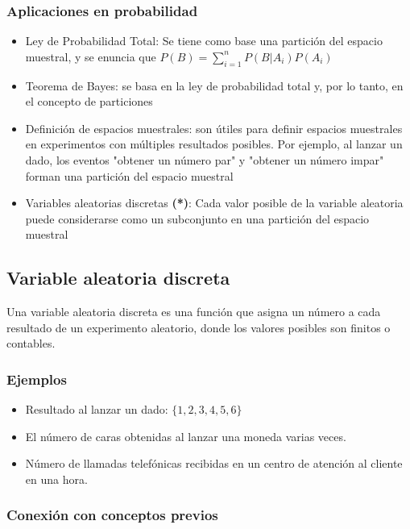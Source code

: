 \documentclass[letterpaper, 12pt]{article}
\begin{document}
	\subsubsection{Aplicaciones en probabilidad}
	
	\begin{itemize}
		\item Ley de Probabilidad Total: Se tiene como base una partición del espacio muestral, y se enuncia que $P(B) = \sum_{i=1}^{n} P(B|A_i)P(A_i)$
		\item Teorema de Bayes: se basa en la ley de probabilidad total y, por lo tanto, en el concepto de particiones
		\item Definición de espacios muestrales: son útiles para definir espacios muestrales en experimentos con múltiples resultados posibles. Por ejemplo, al lanzar un dado, los eventos "obtener un número par" y "obtener un número impar" forman una partición del espacio muestral
		\item Variables aleatorias discretas \textbf{(*)}: Cada valor posible de la variable aleatoria puede considerarse como un subconjunto en una partición del espacio muestral
	\end{itemize}
	
	\subsection{Variable aleatoria discreta}
	
	Una variable aleatoria discreta es una función que asigna un número a cada resultado de un experimento aleatorio, donde los valores posibles son finitos o contables.
	
	\subsubsection{Ejemplos}
	
	\begin{itemize}
		\item Resultado al lanzar un dado: $\{1, 2, 3, 4, 5, 6\}$
		\item El número de caras obtenidas al lanzar una moneda varias veces.
		\item Número de llamadas telefónicas recibidas en un centro de atención al cliente en una hora.
	\end{itemize}
	
	\subsubsection{Conexión con conceptos previos}
	
\end{document}
